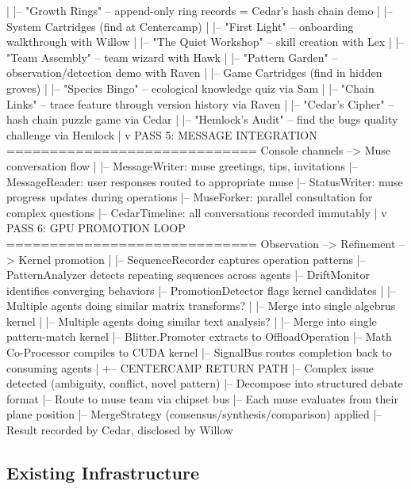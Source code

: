 \documentclass[11pt,letterpaper]{article}
\begin{document}
\begin{asciibox}
    |     |-- "Growth Rings" -- append-only ring records = Cedar's hash chain demo
    |
    |-- System Cartridges (find at Centercamp)
    |     |-- "First Light" -- onboarding walkthrough with Willow
    |     |-- "The Quiet Workshop" -- skill creation with Lex
    |     |-- "Team Assembly" -- team wizard with Hawk
    |     |-- "Pattern Garden" -- observation/detection demo with Raven
    |
    |-- Game Cartridges (find in hidden groves)
    |     |-- "Species Bingo" -- ecological knowledge quiz via Sam
    |     |-- "Chain Links" -- trace feature through version history via Raven
    |     |-- "Cedar's Cipher" -- hash chain puzzle game via Cedar
    |     |-- "Hemlock's Audit" -- find the bugs quality challenge via Hemlock
    |
    v
PASS 5: MESSAGE INTEGRATION
=============================
  Console channels --> Muse conversation flow
    |
    |-- MessageWriter: muse greetings, tips, invitations
    |-- MessageReader: user responses routed to appropriate muse
    |-- StatusWriter: muse progress updates during operations
    |-- MuseForker: parallel consultation for complex questions
    |-- CedarTimeline: all conversations recorded immutably
    |
    v
PASS 6: GPU PROMOTION LOOP
=============================
  Observation --> Refinement --> Kernel promotion
    |
    |-- SequenceRecorder captures operation patterns
    |-- PatternAnalyzer detects repeating sequences across agents
    |-- DriftMonitor identifies converging behaviors
    |-- PromotionDetector flags kernel candidates
    |       |-- Multiple agents doing similar matrix transforms?
    |       |-- Merge into single algebrus kernel
    |       |-- Multiple agents doing similar text analysis?
    |       |-- Merge into single pattern-match kernel
    |-- Blitter.Promoter extracts to OffloadOperation
    |-- Math Co-Processor compiles to CUDA kernel
    |-- SignalBus routes completion back to consuming agents
    |
    +-- CENTERCAMP RETURN PATH
          |-- Complex issue detected (ambiguity, conflict, novel pattern)
          |-- Decompose into structured debate format
          |-- Route to muse team via chipset bus
          |-- Each muse evaluates from their plane position
          |-- MergeStrategy (consensus/synthesis/comparison) applied
          |-- Result recorded by Cedar, disclosed by Willow
\end{asciibox}

\subsection{Existing Infrastructure}
\end{document}
